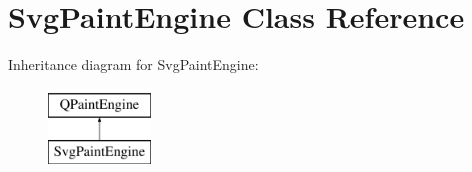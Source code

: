 \hypertarget{class_svg_paint_engine}{}\section{Svg\+Paint\+Engine Class Reference}
\label{class_svg_paint_engine}
Inheritance diagram for Svg\+Paint\+Engine\+:\begin{figure}[H]
\begin{center}
\leavevmode
\includegraphics[height=2.000000cm]{class_svg_paint_engine}
\end{center}
\end{figure}
